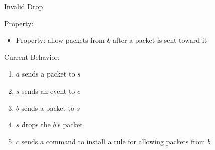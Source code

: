 \begin{frame}{Invalid Drop}
    \begin{center}
    \end{center}
    Property:
    \begin{itemize}
        \item Property: allow packets from $b$ after a packet is sent toward it
    \end{itemize}
    Current Behavior:
    \begin{enumerate}
        \item $a$ sends a packet to $s$
        \item $s$ sends an event to $c$
        \item $b$ sends a packet to $s$
        \item $s$ drops the $b$'s packet
        \item $c$ sends a command to install a rule for allowing packets from $b$
    \end{enumerate}
\end{frame}

